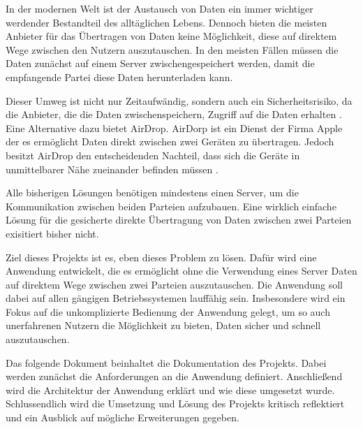In der modernen Welt ist der Austausch von Daten ein immer wichtiger werdender Bestandteil des alltäglichen Lebens. Dennoch bieten die meisten Anbieter für das Übertragen von Daten keine Möglichkeit, diese auf direktem Wege zwischen den Nutzern auszutauschen. In den meisten Fällen müssen die Daten zunächst auf einem Server zwischengespeichert werden, damit die empfangende Partei diese Daten herunterladen kann.

Dieser Umweg ist nicht nur Zeitaufwändig, sondern auch ein Sicherheitsrisiko, da die Anbieter, die die Daten zwischenspeichern, Zugriff auf die Daten erhalten \cite{bsi-cloud}. Eine Alternative dazu bietet AirDrop. AirDorp ist ein Dienst der Firma Apple der es ermöglicht Daten direkt zwischen zwei Geräten zu übertragen. Jedoch besitzt AirDrop den entscheidenden Nachteil, dass sich die Geräte in unmittelbarer Nähe zueinander befinden müssen \cite{apple-airdrop}.

Alle bisherigen Lösungen benötigen mindestens einen Server, um die Kommunikation zwischen beiden Parteien aufzubauen. Eine wirklich einfache Lösung für die gesicherte direkte Übertragung von Daten zwischen zwei Parteien exisitiert bisher nicht.

Ziel dieses Projekts ist es, eben dieses Problem zu lösen. Dafür wird eine Anwendung entwickelt, die es ermöglicht ohne die Verwendung eines Server Daten auf direktem Wege zwischen zwei Parteien auszutauschen. Die Anwendung soll dabei auf allen gängigen Betriebssystemen lauffähig sein. Insbesondere wird ein Fokus auf die unkomplizierte Bedienung der Anwendung gelegt, um so auch unerfahrenen Nutzern die Möglichkeit zu bieten, Daten sicher und schnell auszutauschen.

Das folgende Dokument beinhaltet die Dokumentation des Projekts. Dabei werden zunächst die Anforderungen an die Anwendung definiert. Anschließend wird die Architektur der Anwendung erklärt und wie diese umgesetzt wurde. Schlussendlich wird die Umsetzung und Lösung des Projekts kritisch reflektiert und ein Ausblick auf mögliche Erweiterungen gegeben.